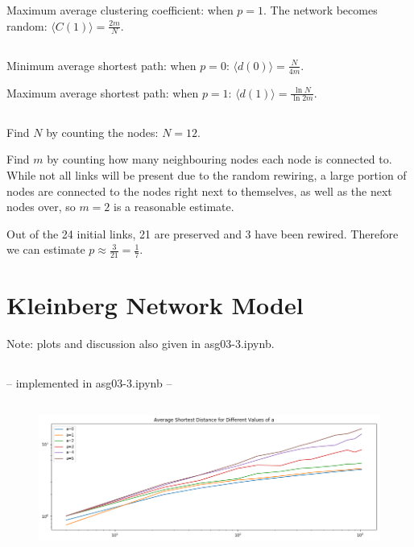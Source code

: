 \documentclass {article}
\begin{document}
Maximum average clustering coefficient: when $ p = 1 $. The network becomes random: $ \langle C(1) \rangle = \frac{ 2m }{ N } $. 

\subsection{}

Minimum average shortest path: when $ p = 0 $: $ \langle d(0) \rangle = \frac{ N }{ 4m } $.

Maximum average shortest path: when $ p = 1 $: $ \langle d(1) \rangle = \frac{ \ln N }{ \ln 2m } $.

\subsection{}
Find $ N $ by counting the nodes: $ N = 12 $.

Find $ m $ by counting how many neighbouring nodes each node is connected to. While not all links will be present due to the random rewiring, a large portion of nodes are connected to the nodes right next to themselves, as well as the next nodes over, so $ m = 2 $ is a reasonable estimate.

Out of the 24 initial links, 21 are preserved and 3 have been rewired. Therefore we can estimate $ p \approx \frac{ 3 }{ 21 } = \frac{ 1 }{ 7 } $.

\newpage



\section{Kleinberg Network Model}

Note: plots and discussion also given in asg03-3.ipynb.

\subsection{}
-- implemented in asg03-3.ipynb --

\subsection{}
\begin{figure}[h!]
  \includegraphics[width=\linewidth]{img/2.png}
\end{figure}
\end{document}

